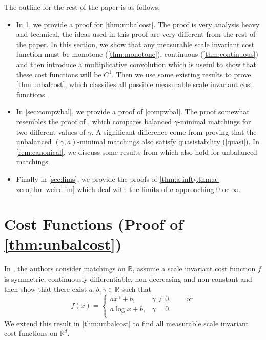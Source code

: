 \documentclass{article}
\begin{document}
The outline for the rest of the paper is as follows.

\begin{itemize}
\item In
\cref{sec:cost}, we provide a proof for \cref{thm:unbalcost}. The
proof is very analysis heavy and technical, the ideas used in this
proof are very different from the rest of the paper. In this section,
we show that any measurable
scale invariant cost function must be monotone (\cref{thm:monotone}),
continuous (\cref{thm:continuous}) and then introduce a multiplicative convolution
which is useful to show that these cost functions will be $C^1$. Then
we use some existing results to prove \cref{thm:unbalcost}, which
classifies all possible measurable scale invariant cost functions.

\item In \cref{sec:compwbal}, we provide a proof of \cref{compwbal}.
  The proof somewhat resembles the proof of
                        \cite[Theorem 3]{minimal}, which compares
                        balanced $\gamma$-minimal  matchings for two
                        different values of $\gamma.$
  A significant
  difference come from proving that the unbalanced
  $(\gamma,a)$-minimal matchings also satisfy  quasistability
  (\cref{quasi}).
 In \cref{rem:canonical}, we discuss some results from \cite{minimal}
  which also hold for unbalanced matchings.

\item
Finally in \cref{sec:lims}, we provide the proofs of
\cref{thm:a-infty,thm:a-zero,thm:weirdlim} which deal with the
limits of $a$ approaching $0$ or $\infty$.
\end{itemize}










\section{Cost Functions (Proof of \cref{thm:unbalcost}) }\label{sec:cost}

In \cite{minimal}, the authors consider matchings on $\mathbb{R}$,
assume a scale invariant cost function $f$ is symmetric,
continuously differentiable, non-decreasing and non-constant and then
show that there exist $a,b,\gamma\in\mathbb{R}$ such that
\[
  f(x) =
  \begin{cases}
    ax^\gamma +b, & \gamma\neq 0, \qquad \mbox{or} \\
    a\log x + b, & \gamma = 0.\\
  \end{cases}
\]
We extend this result in \cref{thm:unbalcost} to find all measurable  scale invariant cost
functions on $\mathbb{R}^d$.
\end{document}

